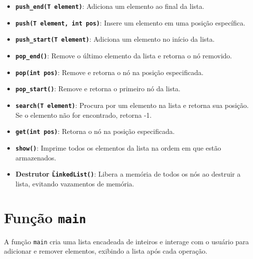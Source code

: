 \documentclass[a4paper,12pt]{article}
\begin{document}
\begin{itemize}
    \item \textbf{\texttt{push\_end(T element)}}: Adiciona um elemento ao final da lista.
    \item \textbf{\texttt{push(T element, int pos)}}: Insere um elemento em uma posição específica.
    \item \textbf{\texttt{push\_start(T element)}}: Adiciona um elemento no início da lista.
    \item \textbf{\texttt{pop\_end()}}: Remove o último elemento da lista e retorna o nó removido.
    \item \textbf{\texttt{pop(int pos)}}: Remove e retorna o nó na posição especificada.
    \item \textbf{\texttt{pop\_start()}}: Remove e retorna o primeiro nó da lista.
    \item \textbf{\texttt{search(T element)}}: Procura por um elemento na lista e retorna sua posição. Se o elemento não for encontrado, retorna -1.
    \item \textbf{\texttt{get(int pos)}}: Retorna o nó na posição especificada.
    \item \textbf{\texttt{show()}}: Imprime todos os elementos da lista na ordem em que estão armazenados.
    \item \textbf{Destrutor \texttt{\~LinkedList()}}: Libera a memória de todos os nós ao destruir a lista, evitando vazamentos de memória.
\end{itemize}

\section{Função \texttt{main}}

A função \texttt{main} cria uma lista encadeada de inteiros e interage com o usuário para adicionar e remover elementos, exibindo a lista após cada operação.
\end{document}
